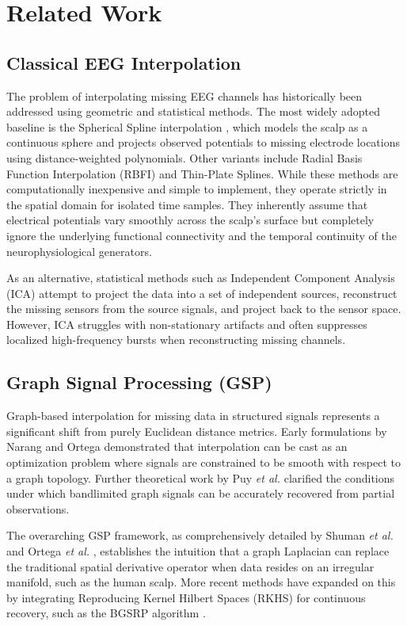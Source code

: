 \section{Related Work}

\subsection{Classical EEG Interpolation}
The problem of interpolating missing EEG channels has historically been addressed using geometric and statistical methods. The most widely adopted baseline is the Spherical Spline interpolation \cite{perrin1989}, which models the scalp as a continuous sphere and projects observed potentials to missing electrode locations using distance-weighted polynomials. Other variants include Radial Basis Function Interpolation (RBFI) \cite{jager2016} and Thin-Plate Splines. While these methods are computationally inexpensive and simple to implement, they operate strictly in the spatial domain for isolated time samples. They inherently assume that electrical potentials vary smoothly across the scalp's surface but completely ignore the underlying functional connectivity and the temporal continuity of the neurophysiological generators.

As an alternative, statistical methods such as Independent Component Analysis (ICA) attempt to project the data into a set of independent sources, reconstruct the missing sensors from the source signals, and project back to the sensor space. However, ICA struggles with non-stationary artifacts and often suppresses localized high-frequency bursts when reconstructing missing channels.

\subsection{Graph Signal Processing (GSP)}
Graph-based interpolation for missing data in structured signals represents a significant shift from purely Euclidean distance metrics. Early formulations by Narang and Ortega \cite{narang2013} demonstrated that interpolation can be cast as an optimization problem where signals are constrained to be smooth with respect to a graph topology. Further theoretical work by Puy \emph{et al.} \cite{puy2018} clarified the conditions under which bandlimited graph signals can be accurately recovered from partial observations.

The overarching GSP framework, as comprehensively detailed by Shuman \emph{et al.} \cite{shuman2013} and Ortega \emph{et al.} \cite{ortega2018}, establishes the intuition that a graph Laplacian can replace the traditional spatial derivative operator when data resides on an irregular manifold, such as the human scalp. More recent methods have expanded on this by integrating Reproducing Kernel Hilbert Spaces (RKHS) for continuous recovery, such as the BGSRP algorithm \cite{zhang2024bgsrp}.


